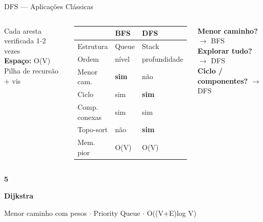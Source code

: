 \documentclass[aspectratio=169,10pt]{beamer}
\begin{document}
\begin{frame}{DFS --- Aplicações Clássicas}
\begin{columns}[t]
\begin{tcolorbox}[caixaAzul,title={Complexidade DFS}]
        Cada aresta verificada 1-2 vezes\\[3pt]
        \textbf{Espaço:} O(V)\\
        Pilha de recursão + vis
      \end{tcolorbox}
      \vspace{0.07cm}
      \begin{tcolorbox}[caixaLaranja,title={DFS vs BFS}]
        \centering\footnotesize
        \begin{tabular}{lll}
          \toprule
          & \textbf{BFS} & \textbf{DFS}\\
          \midrule
          Estrutura & Queue & Stack\\
          Ordem & nível & profundidade\\
          Menor cam. & \textbf{sim} & não\\
          Ciclo & sim & \textbf{sim}\\
          Comp. conexas & sim & sim\\
          Topo-sort & não & \textbf{sim}\\
          Mem. pior & O(V) & O(V)\\
          \bottomrule
        \end{tabular}
      \end{tcolorbox}
      \vspace{0.07cm}
      \begin{tcolorbox}[caixaAmarelo,title={Pergunta mágica}]
        \footnotesize
        \textbf{Menor caminho?} $\to$ BFS\\
        \textbf{Explorar tudo?} $\to$ DFS\\
        \textbf{Ciclo / componentes?} $\to$ DFS
      \end{tcolorbox}
  \end{columns}
\end{frame}

{
\begin{frame}[noframenumbering]
  \centering\vspace{1.2cm}
  {\fontsize{38}{46}\selectfont\bfseries\color{gemaBlue} 5}\par
  \vspace{0.25cm}
  {\Large\color{pqColor}\bfseries Dijkstra}\par
  \vspace{0.15cm}
  {\color{gray}\small Menor caminho com pesos $\cdot$ Priority Queue $\cdot$ O((V+E)log V)}
\end{frame}
}
\end{document}
